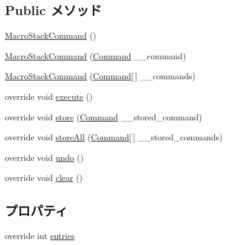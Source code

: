 \subsection*{Public メソッド}
\begin{DoxyCompactItemize}
\item 
\hyperlink{classlazurite_1_1pattern_1_1commanding_1_1_macro_stack_command_a58a5ca1c3b45634264595f53f8e075c6}{MacroStackCommand} ()
\item 
\hyperlink{classlazurite_1_1pattern_1_1commanding_1_1_macro_stack_command_ac765573df5f3edc2313ea77a18afd46d}{MacroStackCommand} (\hyperlink{classlazurite_1_1pattern_1_1commanding_1_1_command}{Command} \_\-\_\-command)
\item 
\hyperlink{classlazurite_1_1pattern_1_1commanding_1_1_macro_stack_command_aad7ea8e50da80eb37b81550081efa142}{MacroStackCommand} (\hyperlink{classlazurite_1_1pattern_1_1commanding_1_1_command}{Command}\mbox{[}$\,$\mbox{]} \_\-\_\-commands)
\item 
override void \hyperlink{classlazurite_1_1pattern_1_1commanding_1_1_macro_stack_command_a9a5a088254429cfb113761f06d09fc9f}{execute} ()
\item 
override void \hyperlink{classlazurite_1_1pattern_1_1commanding_1_1_macro_stack_command_ab18bb77c4756070bdac98a633d80921c}{store} (\hyperlink{classlazurite_1_1pattern_1_1commanding_1_1_command}{Command} \_\-\_\-stored\_\-command)
\item 
override void \hyperlink{classlazurite_1_1pattern_1_1commanding_1_1_macro_stack_command_a3f201d6f11d36c2609de0c31562268a8}{storeAll} (\hyperlink{classlazurite_1_1pattern_1_1commanding_1_1_command}{Command}\mbox{[}$\,$\mbox{]} \_\-\_\-stored\_\-commands)
\item 
override void \hyperlink{classlazurite_1_1pattern_1_1commanding_1_1_macro_stack_command_a6c2b7d10e92b11b774b2fcf0365f6a04}{undo} ()
\item 
override void \hyperlink{classlazurite_1_1pattern_1_1commanding_1_1_macro_stack_command_ab0861f5fbede48b5d0a452e5727e737d}{clear} ()
\end{DoxyCompactItemize}
\subsection*{プロパティ}
\begin{DoxyCompactItemize}
\item 
override int \hyperlink{classlazurite_1_1pattern_1_1commanding_1_1_macro_stack_command_afdf7dd04a8e9c8ecf69c48af762e23cd}{entries}
\end{DoxyCompactItemize}


